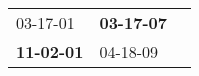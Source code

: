 \begin{supertabular}{p{0.33\columnwidth}p{0.33\columnwidth}p{0.33\columnwidth}}
          03-17-01\textsuperscript{} &  \textbf{03-17-07\textsuperscript{}} \\
 \textbf{11-02-01\textsuperscript{}} &           04-18-09\textsuperscript{} \\
\end{supertabular}
